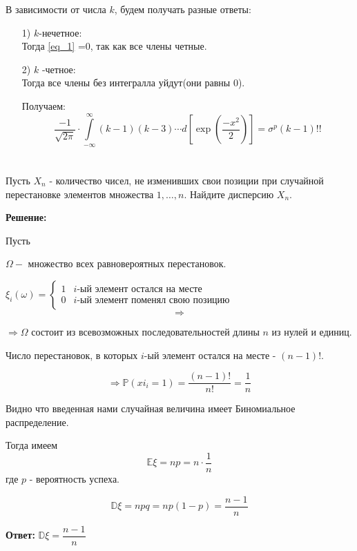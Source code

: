 \documentclass[a4paper,12pt]{article}
\newcommand{\fr}{\frac}
\newcommand{\dfr}{\dfrac}
\newcommand{\bb}{\mathbb}
\newcommand{\Rw}{\Rightarrow}
\begin{document}
В зависимости от числа $k$, будем получать разные ответы:
\begin{enumerate}
	\item[1)] $k$-нечетное:\\
	Тогда \eqref{eq_1} =0, так как все члены четные.
	\item[2)] $k$ -четное:\\
	Тогда все члены без интегралла уйдут(они равны 0).
	
	Получаем:
	 $$\dfrac{-1}{\sqrt{2\pi}} \cdot \int \limits _ {-\infty}^{\infty} (k-1)(k-3) \cdots  d \left[ \exp \left( \dfrac{-x^2}{2} \right) \right]  = {\sigma^p (k-1)!!}$$
\end{enumerate}

\section{}

Пусть $X_n$ - количество чисел, не изменивших свои позиции при случайной перестановке элементов множества ${1,\dots , n}$. Найдите дисперсию $X_n$.

\vspace{\baselineskip}

\textbf{Решение:}

\vspace{\baselineskip}

Пусть

$\Omega - $  множество всех равновероятных перестановок.

$\xi_i(\omega) = \begin{cases}
1 &\text{$i$-ый элемент остался на месте}\\
0 &\text{$i$-ый элемент поменял свою позицию}
\end{cases}$
$$\Rightarrow $$

$\Rw \Omega$ состоит из всевозможных последовательностей длины $n$ из нулей и единиц.

Число перестановок, в которых $i$-ый элемент остался на месте - $(n-1)!$.

$$\Rightarrow \bb P(xi_i = 1) = \fr{(n-1)!}{n!} = \fr{1}{n}$$

Видно что введенная нами случайная величина имеет Биномиальное распределение.

Тогда имеем $$\bb E\xi = np = n\cdot\fr{1}{n}$$ где $p$ - вероятность успеха.

$$\bb D\xi = npq = np(1 - p) = \fr{n - 1}{n}$$

\textbf{Ответ:} $\bb D\xi = \dfr{n - 1}{n}$
\end{document}

